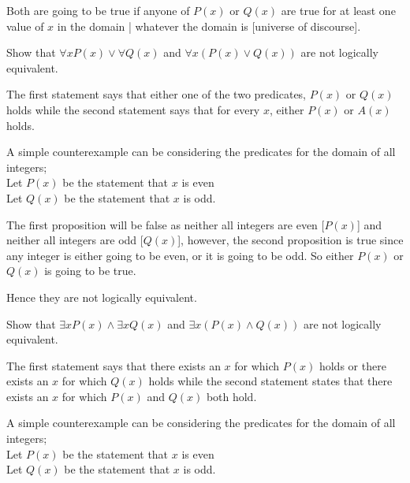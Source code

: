 \documentclass[addpoints]{exam}
\newenvironment{problem}[2][Problem]{\begin{trivlist}
    \item[\hskip \labelsep {\bfseries #1}\hskip \labelsep {\bfseries #2.}]}{\end{trivlist}}
\begin{document}
\begin{sloppypar}
\begin{questions}
\begin{solution}
        Both are going to be true if anyone of $ P(x) $ or $ Q(x) $ are true for at least one value of $x$ in the domain | whatever the domain is [universe of discourse].
    \end{solution}
\end{questions}
\begin{problem}{12}
Show that  $\forall x P(x) \lor \forall Q(x)$ and $\forall x (P(x) \lor Q(x))$ are not logically equivalent.
\end{problem}

\begin{questions}
    \question
    \begin{solution}

        The first statement says that either one of the two predicates, $ P(x) $ or $ Q(x) $ holds while the second statement says that for every $x$, either $ P(x) $ or $ A(x) $ holds. 

        A simple counterexample can be considering the predicates for the domain of all integers; \\ Let $ P(x) $ be the statement that $x$ is even \\ Let $ Q(x) $ be the statement that $x$ is odd. 
        
        The first proposition will be false as neither all integers are even [$ P(x) $] and neither all integers are odd [$ Q(x) $], however, the second proposition is true since any integer is either going to be even, or it is going to be odd. So either $ P(x) $  or $ Q(x) $ is going to be true. 

        Hence they are not logically equivalent.
    \end{solution}
\end{questions}

\begin{problem}{13}
Show that  $\exists x P(x) \land \exists x Q(x)$ and $\exists x (P(x) \land Q(x))$ are not logically equivalent.
\end{problem}

\begin{questions}
    \question
    \begin{solution}

        The first statement says that there exists an $x$ for which $ P(x) $ holds or there exists an $x$ for which $ Q(x) $ holds while the second statement states that there exists an $x$ for which $ P(x) $ and $ Q(x) $ both hold. 

        A simple counterexample can be considering the predicates for the domain of all integers; \\ Let $ P(x) $ be the statement that $x$ is even \\ Let $ Q(x) $ be the statement that $x$ is odd. 


\end{solution}
\end{questions}
\end{sloppypar}
\end{document}
